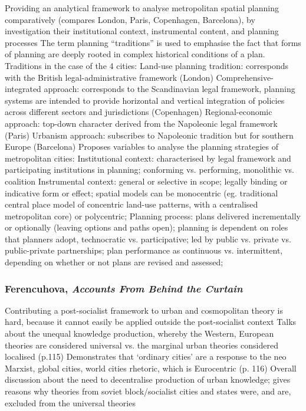 \documentclass{article}
\begin{document}
\begin{outline}
	\1 Providing an analytical framework to analyse metropolitan spatial planning comparatively (compares London, Paris, Copenhagen, Barcelona), by investigation their institutional context, instrumental content, and planning processes
	\1 The term planning ``traditions'' is used to emphasise the fact that forms of planning are deeply rooted in complex historical conditions of a plan. Traditions in the case of the 4 cities:
		\2 Land-use planning tradition: corresponds with the British legal-administrative framework (London)
		\2 Comprehensive-integrated approach: corresponds to the Scandinavian legal framework, planning systems are intended to provide horizontal and vertical integration of policies across different sectors and jurisdictions (Copenhagen)
		\2 Regional-economic approach: top-down character derived from the Napoleonic legal framework (Paris)
		\2 Urbanism approach: subscribes to Napoleonic tradition but for southern Europe (Barcelona)
	\1 Proposes variables to analyse the planning strategies of metropolitan cities:
		\2 Institutional context: characterised by legal framework and participating institutions in planning; conforming vs. performing, monolithic vs. coalition
		\2 Instrumental context: general or selective in scope; legally binding or indicative form or effect; spatial models can be monocentric (eg. traditional central place model of concentric land-use patterns, with a centralised metropolitan core) or polycentric; 
		\2 Planning process: plans delivered incrementally or optionally (leaving options and paths open); planning is dependent on roles that planners adopt, technocratic vs. participative; led by public vs. private vs. public-private partnerships; plan performance as continuous vs. intermittent, depending on whether or not plans are revised and assessed;
\end{outline}

\subsubsection{Ferencuhova, \textit{Accounts From Behind the Curtain}}

\begin{outline}
	\1 Contributing a post-socialist framework to urban and cosmopolitan theory is hard, because it cannot easily be applied outside the post-socialist context
	\1 Talks about the unequal knowledge production, whereby the Western, European theories are considered universal vs. the marginal urban theories considered localised (p.115)
	\1 Demonstrates that `ordinary cities' are a response to the neo Marxist, global cities, world cities rhetoric, which is Eurocentric (p. 116)
	\1 Overall discussion about the need to decentralise production of urban knowledge; gives reasons why theories from soviet block/socialist cities and states were, and are, excluded from the universal theories
\end{outline}
\end{document}
